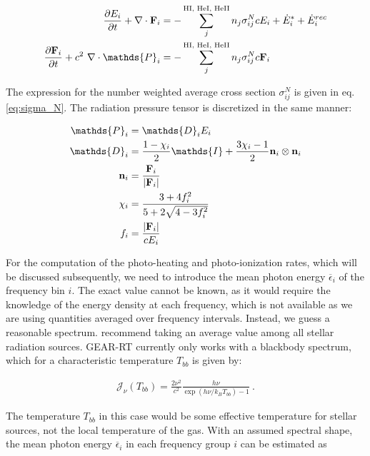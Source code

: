 \begin{align}
	\DELDT{E_i} + \nabla \cdot \Fbf_i &=
		- \sum\limits_{j}^{\absorbers} n_j \sigma_{i j}^N c E_i + \dot{E}_i^* + \dot{E}_i ^{rec}
		\label{eq:dEdt-group} \\
	\DELDT{\Fbf_i} + c^2 \ \nabla \cdot \mathds{P}_i &=
		- \sum\limits_{j}^{\absorbers} n_j \sigma_{i j}^N c \Fbf_i
		\label{eq:dFdt-group}
\end{align}


The expression for the number weighted average cross section $\sigma_{ij}^N$ is given in eq.
\ref{eq:sigma_N}. The radiation pressure tensor is discretized in the same manner:

\begin{align}
	\mathds{P}_i &=
        \mathds{D}_i E_i \label{eq:pressure-tensor-group-start}\\
	\mathds{D}_i &=
        \frac{1- \chi_i}{2} \mathds{I} + \frac{3 \chi_i - 1}{2} \mathbf{n}_i \otimes \mathbf{n}_i
        \label{eq:eddington-group} \\
	\mathbf{n}_i &=
        \frac{\Fbf_i}{|\Fbf_i|} \\
	\chi_i &=
        \frac{3 + 4 f_i ^2}{5 + 2 \sqrt{4 - 3 f_i^2}} \\
	f_i &=
        \frac{|\Fbf_i|}{c E_i} \label{eq:pressure-tensor-group-end}
\end{align}



For the computation of the photo-heating and photo-ionization rates, which will be discussed
subsequently, we need to introduce the mean photon energy $\overline{\epsilon}_i$ of the frequency
bin $i$. The exact value cannot be known, as it would require the knowledge of the energy density at
each frequency, which is not available as we are using quantities averaged over frequency intervals.
Instead, we guess a reasonable spectrum. \cite{ramses-rt13} recommend taking an average value among
all stellar radiation sources. GEAR-RT currently only works with a blackbody spectrum, which for a
characteristic temperature $T_{bb}$ is given by:

\begin{align}
    \mathcal{J}_\nu(T_{bb}) = \frac{2 \nu^2}{c^2} \frac{h \nu}{\exp\left(h\nu/k_B T_{bb}\right) -
1} \ .
    \label{eq:blackbody}
\end{align}

The temperature $T_{bb}$ in this case would be some effective temperature for stellar sources, not
the local temperature of the gas. With an assumed spectral shape, the mean photon energy
$\overline{\epsilon}_i$ in each frequency group $i$ can be estimated as


